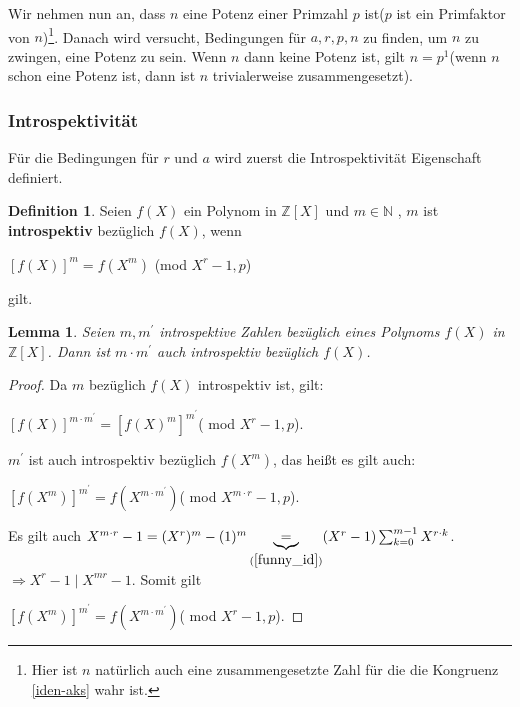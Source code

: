 \documentclass[12pt,oneside]{article}
\newtheorem{lemma}[theorem]{Lemma}
\theoremstyle{remark}
\theoremstyle{definition}
\newtheorem{definition}{Definition}[section]
\begin{document}
\begin{flushleft}
Wir nehmen nun an, dass $n$ eine Potenz einer Primzahl $p$ ist($p$ ist ein Primfaktor von $n$)\footnote{Hier ist $n$ natürlich auch eine zusammengesetzte Zahl für die die Kongruenz \ref{iden-aks} wahr ist.}. Danach wird versucht, Bedingungen für $a, r,p,n$ zu finden, um $n$ zu zwingen, eine Potenz zu sein. Wenn $n$ dann keine Potenz ist, gilt $n = p^1$(wenn $n$ schon eine Potenz ist, dann ist $n$ trivialerweise zusammengesetzt). 

\subsubsection{Introspektivität}
Für die Bedingungen für $r$ und $a$ wird zuerst die Introspektivität Eigenschaft definiert.

\begin{definition}
Seien $f(X)$ ein Polynom in $\mathbb{Z}[X]$ und $m \in \mathbb{N}$ , $m$ ist \textbf{introspektiv} bezüglich $f(X)$, wenn\newline\newline
    \centerline{$[f(X)]^{m} = f(X^m)$ (mod $X^r - 1,p$)} 
gilt. 
\end{definition}

\smallskip

\begin{lemma}\label{intros_num}
Seien $m,m^{'}$ introspektive Zahlen bezüglich eines Polynoms $f(X)$ in $\mathbb{Z}[X]$. Dann ist $m \cdot m^{'}$ auch introspektiv bezüglich $f(X)$.
\end{lemma}

\begin{proof}
Da $m$ bezüglich $f(X)$ introspektiv ist, gilt:\newline\newline
\centerline{$[f(X)]^{m \cdot m^{'}} = [f(X)^{m}]^{m^{'}}$( mod $X^r - 1, p$).}\newline\newline
$m^{'}$ ist auch introspektiv bezüglich $f(X^{m})$, das heißt es gilt auch:\newline\newline
\centerline{$[f(X^m)]^{m^{'}} = f(X^{m \cdot m^{'}})$( mod $X^{m\cdot r} - 1, p$).}\newline\newline

Es gilt auch $X^{m \cdot r } - 1 = (X^{r})^{m} - (1)^m \underbrace{=}_{(\ref{funny_id})} (X^{r} - 1) \sum_{k = 0}^{m-1} X^{r \cdot k}$.\newline\newline$\Rightarrow X^{r} - 1\mid X^{mr} - 1$. Somit gilt\newline\newline
\centerline{$[f(X^m)]^{m^{'}} = f(X^{m \cdot m^{'}})$( mod $X^{r} - 1,p$).}\newline


\end{proof}
\end{flushleft}
\end{document}
